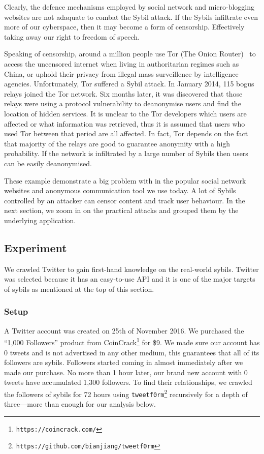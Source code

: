 Clearly, the defence mechanisms employed by social network and micro-blogging
websites are not adaquate to combat the Sybil attack. If the Sybils infiltrate
even more of our cyberspace, then it may become a form of censorship.
Effectively taking away our right to freedom of speech.

Speaking of censorship, around a million \cite{tormetric} people use Tor (The
Onion Router)~\cite{dingledine2004tor} to access the uncensored internet when
living in authoritarian regimes such as China, or uphold their privacy from
illegal mass surveillence by intelligence agencies. Unfortunately, Tor suffered
a Sybil attack. In January 2014, 115 bogus relays joined the Tor network. Six months
later, it was discovered that those relays were using a protocol vulnerability
to deanonymise users and find the location of hidden services. It is unclear to
the Tor developers which users are affected or what information was retrieved,
thus it is assumed that users who used Tor between that period are all
affected\cite{torsybil}. In fact, Tor depends on the fact that majority of the
relays are good to guarantee anonymity with a high probability. If the network
is infiltrated by a large number of Sybils then users can be easily
deanonymised.

These example demonstrate a big problem with in the popular social network
websites and anonymous communication tool we use today. A lot of Sybils
controlled by an attacker can censor content and track user behaviour. In the
next section, we zoom in on the practical attacks and grouped them by the
underlying application.

\subsection{Experiment}
We crawled Twitter to gain first-hand knowledge on the real-world sybils.
Twitter was selected because it has an easy-to-use API and it is one of the
major targets of sybils as mentioned at the top of this section.

\subsubsection{Setup}
A Twitter account was created on 25th of November 2016. We purchased the ``1,000
Followers'' product from CoinCrack\footnote{\texttt{https://coincrack.com/}} for
\$9. We made sure our account has 0 tweets and is not advertised in any other
medium, this guarantees that all of its followers are sybils. Followers started
coming in almost immediately after we made our purchase. No more than 1 hour
later, our brand new account with 0 tweets have accumulated 1,300 followers. To
find their relationships, we crawled the followers of sybils for 72 hours using
\verb!tweetf0rm!\footnote{\texttt{https://github.com/bianjiang/tweetf0rm}}
recursively for a depth of three---more than enough for our analysis below.

